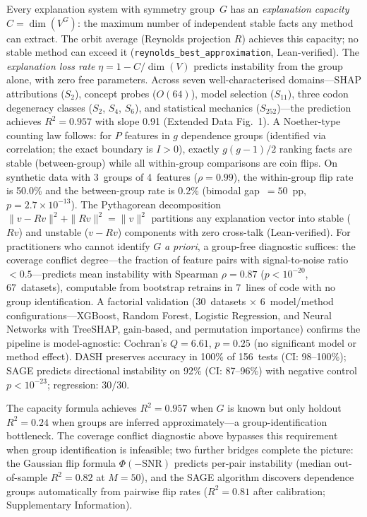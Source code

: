 \documentclass[11pt]{article}
\begin{document}
Every explanation system with symmetry group~$G$ has an \emph{explanation
capacity} $C = \dim(V^G)$: the maximum number of independent stable facts
any method can extract.  The orbit average (Reynolds projection $R$)
achieves this capacity; no stable method can exceed it
(\texttt{reynolds\_best\_approximation}, Lean-verified).  The
\emph{explanation loss rate} $\eta = 1 - C/\dim(V)$ predicts instability
from the group alone, with zero free parameters.
Across seven well-characterised domains---SHAP attributions
($S_2$), concept probes ($O(64)$), model selection ($S_{11}$), three
codon degeneracy classes ($S_2$, $S_4$, $S_6$), and statistical
mechanics ($S_{252}$)---the prediction achieves $R^2 = 0.957$ with slope
0.91 (Extended Data Fig.~1).  A Noether-type counting law follows: for
$P$ features in $g$ dependence groups (identified via correlation; the exact boundary is $I > 0$), exactly $g(g-1)/2$ ranking facts
are stable (between-group) while all within-group comparisons are coin
flips.  On synthetic data with 3~groups of 4~features ($\rho = 0.99$),
the within-group flip rate is 50.0\% and the between-group rate is 0.2\%
(bimodal gap~$= 50$~pp, $p = 2.7 \times 10^{-13}$).
The Pythagorean decomposition $\|v - Rv\|^2 + \|Rv\|^2 = \|v\|^2$
partitions any explanation vector into stable ($Rv$) and unstable
($v - Rv$) components with zero cross-talk (Lean-verified).
For practitioners who cannot identify $G$ \emph{a priori}, a
group-free diagnostic suffices: the coverage conflict degree---the
fraction of feature pairs with signal-to-noise ratio $< 0.5$---predicts
mean instability with Spearman $\rho = 0.87$ ($p < 10^{-20}$,
67~datasets), computable from bootstrap retrains in 7~lines of code
with no group identification.  A factorial validation
(30~datasets $\times$ 6~model/method configurations---XGBoost, Random
Forest, Logistic Regression, and Neural Networks with TreeSHAP,
gain-based, and permutation importance) confirms the pipeline is
model-agnostic: Cochran's $Q = 6.61$, $p = 0.25$ (no significant model
or method effect).  DASH preserves accuracy in 100\% of 156~tests (CI:
98--100\%); SAGE predicts directional instability on 92\% (CI:
87--96\%) with negative control $p < 10^{-23}$; regression: 30/30.

The capacity formula achieves $R^2 = 0.957$ when $G$ is known but only
holdout $R^2 = 0.24$ when groups are inferred approximately---a
group-identification bottleneck.  The coverage conflict diagnostic
above bypasses this requirement when group identification is infeasible;
two further bridges complete the picture:
the Gaussian flip formula $\Phi(-\mathrm{SNR})$ predicts per-pair
instability (median out-of-sample $R^2 = 0.82$ at $M = 50$), and the
SAGE algorithm discovers dependence groups automatically from pairwise
flip rates ($R^2 = 0.81$ after calibration; Supplementary Information).
\end{document}
